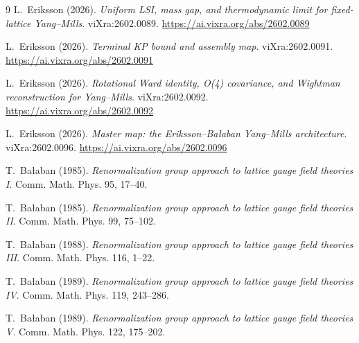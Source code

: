 \documentclass[11pt,a4paper]{article}
\begin{document}
\begin{thebibliography}{9}
L.~Eriksson (2026).
\emph{Uniform LSI, mass gap, and thermodynamic limit for fixed-lattice
Yang--Mills}.
viXra:2602.0089.
\url{https://ai.vixra.org/abs/2602.0089}

L.~Eriksson (2026).
\emph{Terminal KP bound and assembly map}.
viXra:2602.0091.
\url{https://ai.vixra.org/abs/2602.0091}

L.~Eriksson (2026).
\emph{Rotational Ward identity, O(4) covariance, and Wightman reconstruction
for Yang--Mills}.
viXra:2602.0092.
\url{https://ai.vixra.org/abs/2602.0092}

L.~Eriksson (2026).
\emph{Master map: the Eriksson--Ba{\l}aban Yang--Mills architecture}.
viXra:2602.0096.
\url{https://ai.vixra.org/abs/2602.0096}

T.~Ba{\l}aban (1985).
\emph{Renormalization group approach to lattice gauge field theories I}.
Comm. Math. Phys. 95, 17--40.

T.~Ba{\l}aban (1985).
\emph{Renormalization group approach to lattice gauge field theories II}.
Comm. Math. Phys. 99, 75--102.

T.~Ba{\l}aban (1988).
\emph{Renormalization group approach to lattice gauge field theories III}.
Comm. Math. Phys. 116, 1--22.

T.~Ba{\l}aban (1989).
\emph{Renormalization group approach to lattice gauge field theories IV}.
Comm. Math. Phys. 119, 243--286.

T.~Ba{\l}aban (1989).
\emph{Renormalization group approach to lattice gauge field theories V}.
Comm. Math. Phys. 122, 175--202.

\end{thebibliography}
\end{document}
